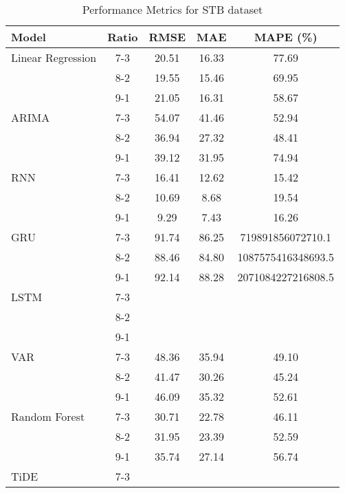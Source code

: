 \begin{table}[h!]
    \centering
    \caption{Performance Metrics for STB dataset}
    \begin{tabular}{|l|c|c|c|c|}
    \hline
    \rowcolor{orange!30} \textbf{Model} & \textbf{Ratio} & \textbf{RMSE} & \textbf{MAE} & \textbf{MAPE (\%)} \\ \hline
    \rowcolor{white} Linear Regression & 7-3 & 20.51 & 16.33 & 77.69 \\ \hline
    \rowcolor{white}  & 8-2 & 19.55 & 15.46 & 69.95 \\ \hline
    \rowcolor{white}  & 9-1 & 21.05 & 16.31 & 58.67 \\ \hline
    \rowcolor{white} ARIMA & 7-3 & 54.07 & 41.46 & 52.94 \\ \hline
    \rowcolor{white}  & 8-2 & 36.94 & 27.32 & 48.41 \\ \hline
    \rowcolor{white}  & 9-1 & 39.12 & 31.95 & 74.94 \\ \hline
    \rowcolor{white} RNN & 7-3 & 16.41 & 12.62 & 15.42 \\ \hline
    \rowcolor{white}  & 8-2 & 10.69 & 8.68 & 19.54 \\ \hline
    \rowcolor{white}  & 9-1 & 9.29 & 7.43 & 16.26 \\ \hline
    \rowcolor{white} GRU & 7-3 & 91.74 & 86.25 & 719891856072710.1 \\ \hline
    \rowcolor{white}  & 8-2 & 88.46 & 84.80 &  1087575416348693.5 \\ \hline
    \rowcolor{white}  & 9-1 & 92.14 & 88.28 & 2071084227216808.5 \\ \hline
    \rowcolor{white} LSTM & 7-3 &  &  &  \\ \hline
    \rowcolor{white}  & 8-2 &  &  &  \\ \hline
    \rowcolor{white}  & 9-1 &  &  &  \\ \hline
    \rowcolor{white} VAR & 7-3 & 48.36 & 35.94 & 49.10 \\ \hline
    \rowcolor{white}  & 8-2 & 41.47 & 30.26 & 45.24 \\ \hline
    \rowcolor{white}  & 9-1 & 46.09 & 35.32 & 52.61 \\ \hline
    \rowcolor{white} Random Forest & 7-3 & 30.71 & 22.78 & 46.11 \\ \hline
    \rowcolor{white}  & 8-2 & 31.95 & 23.39 & 52.59 \\ \hline
    \rowcolor{white}  & 9-1 & 35.74 & 27.14 & 56.74 \\ \hline
    \rowcolor{green!30} TiDE & 7-3 &  &  &  \\ \hline

\end{tabular}
\end{table}
